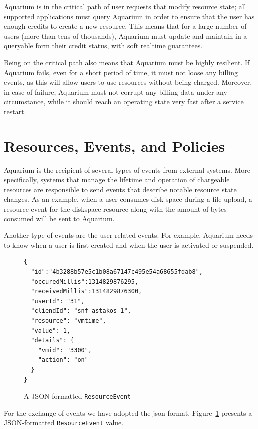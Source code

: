\documentclass[letterpaper,twocolumn,10pt]{article}
\begin{document}
Aquarium is in the critical path of user requests that modify resource
state; all supported applications must query Aquarium in order to
ensure that the user has enough credits to create a new resource. This
means that for a large number of users (more than tens of thousands),
Aquarium must update and maintain in a queryable form their credit
status, with soft realtime guarantees.

Being on the critical path also means that Aquarium must be highly
resilient. If Aquarium fails, even for a short period of time, it must
not loose any billing events, as this will allow users to use
resources without being charged. Moreover, in case of failure,
Aquarium must not corrupt any billing data under any circumstance,
while it should reach an operating state very fast after a service
restart.

\section{Resources, Events, and Policies}

Aquarium is the recipient of several types of events from external
systems. More specifically, systems that manage the lifetime and
operation of chargeable resources are responsible to send events that
describe notable resource state changes. As an example, when a user
consumes disk space during a file upload, a resource event for the
\textsf{diskspace} resource along with the amount of bytes consumed
will be sent to Aquarium.

Another type of events are the user-related events. For example,
Aquarium needs to know when a user is first created and when the user
is activated or suspended. 

\begin{figure}[th]
\lstset{language=C, basicstyle=\footnotesize,
stringstyle=\ttfamily, 
flexiblecolumns=true, aboveskip=-0.9em, belowskip=0em, lineskip=0em}

\begin{lstlisting}
{
  "id":"4b3288b57e5c1b08a67147c495e54a68655fdab8",
  "occuredMillis":1314829876295,
  "receivedMillis":1314829876300,
  "userId": "31",
  "cliendId": "snf-astakos-1",
  "resource": "vmtime",
  "value": 1,
  "details": {
    "vmid": "3300",
    "action": "on"
  }
}
\end{lstlisting}
\caption{A JSON-formatted \texttt{ResourceEvent}} 
\label{fig:resevt}
\end{figure}

For the exchange of events we have adopted the {\sc json} format.
Figure~\ref{fig:resevt} presents a JSON-formatted
\texttt{ResourceEvent} value. 
\end{document}
